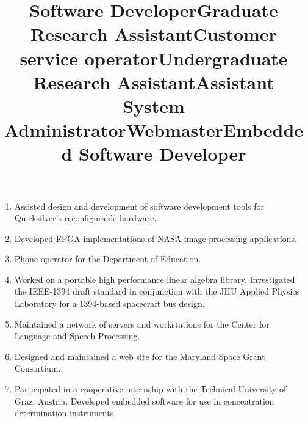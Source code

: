 \documentclass[line]{res}
\begin{document}
\begin{resume}
\begin{enumerate}
		\item {} 
		\title{Software Developer} 
		  
		\begin{position}
			Assisted design and development of software development tools for Quicksilver's reconfigurable hardware. 
		\end{position}
		
		\item {} 
		\title{Graduate Research Assistant} 
		  
		\begin{position}
			Developed FPGA implementations of NASA image processing applications. 
		\end{position}
		
		\item {} 
		\title{Customer service operator} 
		  
		\begin{position}
			Phone operator for the Department of Education. 
		\end{position}
		
		\item {} 
		\title{Undergraduate Research Assistant} 
		  
		\begin{position}
			Worked on a portable high performance linear algebra library. Investigated the IEEE-1394 draft standard in conjunction with the JHU Applied Physics Laboratory for a 1394-based spacecraft bus design. 
		\end{position}
		
		\item 
		\title{Assistant System Administrator} 
		\begin{position}
			Maintained a network of servers and workstations for the Center for Language and Speech Processing. 
		\end{position}
		
		\item 
		\title{Webmaster} 
		\begin{position}
			Designed and maintained a web site for the Maryland Space Grant Consortium. 
		\end{position}
		
		\item {} 
		\title{Embedded Software Developer} 
		  
		\begin{position}
			Participated in a cooperative internship with the Technical University of Graz, Austria. Developed embedded software for use in concentration determination instruments. 
		\end{position}
		

\end{enumerate}
\end{resume}
\end{document}
